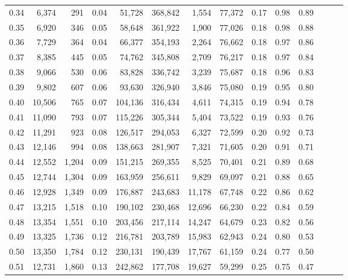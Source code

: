 \begin{tabular}{rrrrrrrrrrrrrr}
0.34 &   6,374 &    291 &  0.04 &   51,728 &  368,842 &   1,554 &  77,372 &  0.17 &  0.98 &      0.89 \\
0.35 &   6,920 &    346 &  0.05 &   58,648 &  361,922 &   1,900 &  77,026 &  0.18 &  0.98 &      0.88 \\
0.36 &   7,729 &    364 &  0.04 &   66,377 &  354,193 &   2,264 &  76,662 &  0.18 &  0.97 &      0.86 \\
0.37 &   8,385 &    445 &  0.05 &   74,762 &  345,808 &   2,709 &  76,217 &  0.18 &  0.97 &      0.84 \\
0.38 &   9,066 &    530 &  0.06 &   83,828 &  336,742 &   3,239 &  75,687 &  0.18 &  0.96 &      0.83 \\
0.39 &   9,802 &    607 &  0.06 &   93,630 &  326,940 &   3,846 &  75,080 &  0.19 &  0.95 &      0.80 \\
0.40 &  10,506 &    765 &  0.07 &  104,136 &  316,434 &   4,611 &  74,315 &  0.19 &  0.94 &      0.78 \\
0.41 &  11,090 &    793 &  0.07 &  115,226 &  305,344 &   5,404 &  73,522 &  0.19 &  0.93 &      0.76 \\
0.42 &  11,291 &    923 &  0.08 &  126,517 &  294,053 &   6,327 &  72,599 &  0.20 &  0.92 &      0.73 \\
0.43 &  12,146 &    994 &  0.08 &  138,663 &  281,907 &   7,321 &  71,605 &  0.20 &  0.91 &      0.71 \\
0.44 &  12,552 &  1,204 &  0.09 &  151,215 &  269,355 &   8,525 &  70,401 &  0.21 &  0.89 &      0.68 \\
0.45 &  12,744 &  1,304 &  0.09 &  163,959 &  256,611 &   9,829 &  69,097 &  0.21 &  0.88 &      0.65 \\
0.46 &  12,928 &  1,349 &  0.09 &  176,887 &  243,683 &  11,178 &  67,748 &  0.22 &  0.86 &      0.62 \\
0.47 &  13,215 &  1,518 &  0.10 &  190,102 &  230,468 &  12,696 &  66,230 &  0.22 &  0.84 &      0.59 \\
0.48 &  13,354 &  1,551 &  0.10 &  203,456 &  217,114 &  14,247 &  64,679 &  0.23 &  0.82 &      0.56 \\
0.49 &  13,325 &  1,736 &  0.12 &  216,781 &  203,789 &  15,983 &  62,943 &  0.24 &  0.80 &      0.53 \\
0.50 &  13,350 &  1,784 &  0.12 &  230,131 &  190,439 &  17,767 &  61,159 &  0.24 &  0.77 &      0.50 \\
0.51 &  12,731 &  1,860 &  0.13 &  242,862 &  177,708 &  19,627 &  59,299 &  0.25 &  0.75 &      0.47 \\

\end{tabular}
